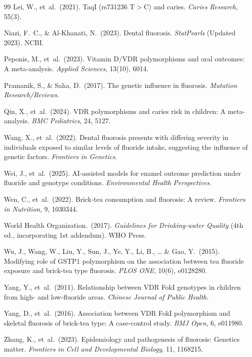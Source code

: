 \documentclass[12pt,a4paper]{article}
\begin{document}
\begin{thebibliography}{99}
Lei, W., et~al.\ (2021).
TaqI (rs731236 T$>$C) and caries.
\textit{Caries Research}, 55(3).

Niazi, F.\ C., \& Al-Khanati, N.\ (2023).
Dental fluorosis.
\textit{StatPearls} (Updated 2023). NCBI.

Peponis, M., et~al.\ (2023).
Vitamin D/VDR polymorphisms and oral outcomes: A meta-analysis.
\textit{Applied Sciences}, 13(10), 6014.

Pramanik, S., \& Saha, D.\ (2017).
The genetic influence in fluorosis.
\textit{Mutation Research/Reviews}.

Qin, X., et~al.\ (2024).
VDR polymorphisms and caries risk in children: A meta-analysis.
\textit{BMC Pediatrics}, 24, 5127.

Wang, X., et~al.\ (2022).
Dental fluorosis presents with differing severity in individuals exposed to similar levels of
fluoride intake, suggesting the influence of genetic factors.
\textit{Frontiers in Genetics}.

Wei, J., et~al.\ (2025).
AI-assisted models for enamel outcome prediction under fluoride and genotype conditions.
\textit{Environmental Health Perspectives}.

Wen, C., et~al.\ (2022).
Brick-tea consumption and fluorosis: A review.
\textit{Frontiers in Nutrition}, 9, 1030344.

World Health Organization.\ (2017).
\textit{Guidelines for Drinking-water Quality} (4th ed., incorporating 1st addendum).
WHO Press.

Wu, J., Wang, W., Liu, Y., Sun, J., Ye, Y., Li, B., \ldots{} \& Gao, Y.\ (2015).
Modifying role of GSTP1 polymorphism on the association between tea fluoride exposure and
brick-tea type fluorosis.
\textit{PLOS ONE}, 10(6), e0128280.

Yang, Y., et~al.\ (2011).
Relationship between VDR FokI genotypes in children from high- and low-fluoride areas.
\textit{Chinese Journal of Public Health}.

Yang, D., et~al.\ (2016).
Association between VDR FokI polymorphism and skeletal fluorosis of brick-tea type:
A case-control study.
\textit{BMJ Open}, 6, e011980.

Zhang, K., et~al.\ (2023).
Epidemiology and pathogenesis of fluorosis: Genetics matter.
\textit{Frontiers in Cell and Developmental Biology}, 11, 1168215.

\end{thebibliography}
\end{document}
